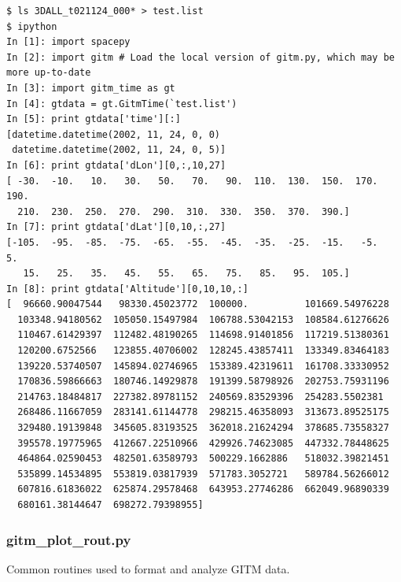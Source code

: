 \begin{verbatim}
$ ls 3DALL_t021124_000* > test.list
$ ipython
In [1]: import spacepy
In [2]: import gitm # Load the local version of gitm.py, which may be more up-to-date
In [3]: import gitm_time as gt
In [4]: gtdata = gt.GitmTime(`test.list')
In [5]: print gtdata['time'][:]
[datetime.datetime(2002, 11, 24, 0, 0)
 datetime.datetime(2002, 11, 24, 0, 5)]
In [6]: print gtdata['dLon'][0,:,10,27]
[ -30.  -10.   10.   30.   50.   70.   90.  110.  130.  150.  170.  190.
  210.  230.  250.  270.  290.  310.  330.  350.  370.  390.]
In [7]: print gtdata['dLat'][0,10,:,27]
[-105.  -95.  -85.  -75.  -65.  -55.  -45.  -35.  -25.  -15.   -5.    5.
   15.   25.   35.   45.   55.   65.   75.   85.   95.  105.]
In [8]: print gtdata['Altitude'][0,10,10,:]
[  96660.90047544   98330.45023772  100000.          101669.54976228
  103348.94180562  105050.15497984  106788.53042153  108584.61276626
  110467.61429397  112482.48190265  114698.91401856  117219.51380361
  120200.6752566   123855.40706002  128245.43857411  133349.83464183
  139220.53740507  145894.02746965  153389.42319611  161708.33330952
  170836.59866663  180746.14929878  191399.58798926  202753.75931196
  214763.18484817  227382.89781152  240569.83529396  254283.5502381
  268486.11667059  283141.61144778  298215.46358093  313673.89525175
  329480.19139848  345605.83193525  362018.21624294  378685.73558327
  395578.19775965  412667.22510966  429926.74623085  447332.78448625
  464864.02590453  482501.63589793  500229.1662886   518032.39821451
  535899.14534895  553819.03817939  571783.3052721   589784.56266012
  607816.61836022  625874.29578468  643953.27746286  662049.96890339
  680161.38144647  698272.79398955]
\end{verbatim}

\subsubsection{gitm\_plot\_rout.py}

Common routines used to format and analyze GITM data.

